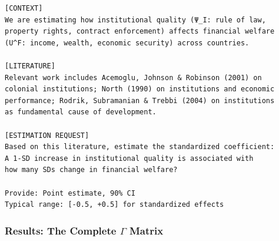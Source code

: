 \begin{verbatim}
[CONTEXT]
We are estimating how institutional quality (Ψ_I: rule of law, 
property rights, contract enforcement) affects financial welfare 
(U^F: income, wealth, economic security) across countries.

[LITERATURE]
Relevant work includes Acemoglu, Johnson & Robinson (2001) on 
colonial institutions; North (1990) on institutions and economic 
performance; Rodrik, Subramanian & Trebbi (2004) on institutions 
as fundamental cause of development.

[ESTIMATION REQUEST]
Based on this literature, estimate the standardized coefficient:
A 1-SD increase in institutional quality is associated with 
how many SDs change in financial welfare?

Provide: Point estimate, 90% CI
Typical range: [-0.5, +0.5] for standardized effects
\end{verbatim}

\subsubsection{Results: The Complete $\Gamma$ Matrix}

